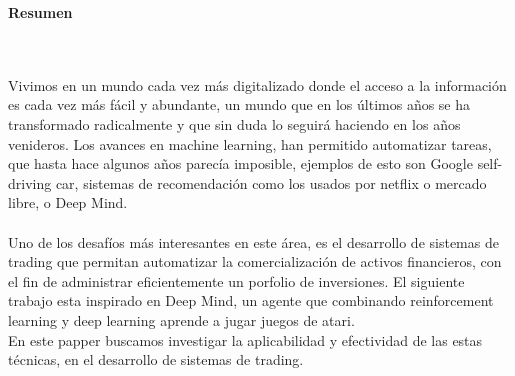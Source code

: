 \begin{center}\huge{\textbf{Resumen}}\end{center}

\noindent
\\
\\
Vivimos en un mundo cada vez más digitalizado donde el acceso a la información es cada vez más fácil y abundante, un mundo que en los últimos años se ha transformado radicalmente y que sin duda lo seguirá haciendo en los años venideros. Los avances en machine learning, han permitido automatizar tareas, que hasta hace algunos años parecía imposible, ejemplos de esto son Google self-driving car, sistemas de recomendación como los usados por netflix o mercado libre, o Deep Mind.
\\
\\
Uno de los desafíos más interesantes en este área, es el desarrollo de sistemas de trading que permitan automatizar la comercialización de activos financieros, con el fin de administrar eficientemente un porfolio de inversiones.
El siguiente trabajo esta inspirado en Deep Mind, un agente que combinando reinforcement learning y deep learning aprende a jugar juegos de atari. \\
En este papper buscamos investigar la aplicabilidad y efectividad de las estas técnicas, en el desarrollo de sistemas de trading. 



